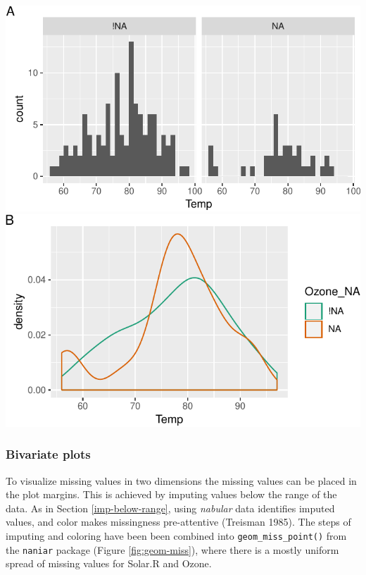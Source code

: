 \documentclass[]{article}
\let\origfigure\figure
\let\endorigfigure\endfigure
\renewenvironment{figure}[1][2] {
    \expandafter\origfigure\expandafter[H]
} {
    \endorigfigure
}
\theoremstyle{definition}
\theoremstyle{definition}
\theoremstyle{definition}
\theoremstyle{remark}
\begin{document}
\begin{figure}

{\centering \includegraphics[width=0.49\linewidth]{tidy-missing-data-paper_files/figure-latex/bind-shadow-density-1} \includegraphics[width=0.49\linewidth]{tidy-missing-data-paper_files/figure-latex/bind-shadow-density-2} 

}

\caption{A visualization of temperature according to missingness in ozone from in the airquality dataset. A histogram of temperature facetted by the missingness of ozone (A), or a density of temperature colored by missingness in ozone (B). The distribution shows a cluster of low temperature observations with missing ozone values, but the temperature values are otherwise similar.}\label{fig:bind-shadow-density}
\end{figure}

\hypertarget{bivariate-plots}{%
\subsubsection{Bivariate plots}\label{bivariate-plots}}

To visualize missing values in two dimensions the missing values can be
placed in the plot margins. This is achieved by imputing values below
the range of the data. As in Section \ref{imp-below-range}, using
\emph{nabular} data identifies imputed values, and color makes
missingness pre-attentive (Treisman 1985). The steps of imputing and
coloring have been been combined into \texttt{geom\_miss\_point()} from
the \texttt{naniar} package (Figure \ref{fig:geom-miss}), where there is
a mostly uniform spread of missing values for Solar.R and Ozone.
\end{document}
